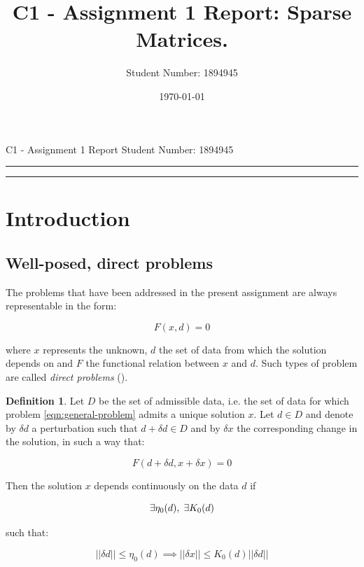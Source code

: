 \documentclass{article}
\title{C1 - Assignment 1 Report: Sparse Matrices.} %
\author{Student Number: 1894945} %
\date{\today} %
\theoremstyle{theorem}
\theoremstyle{definition}
\newtheorem{definition}{Definition}
\begin{document}
\maketitle %

\begin{center}
C1 - Assignment 1 Report \hfill
Student Number: 1894945
\vspace{3pt} \hrule \vspace{3pt} \hrule
\end{center}

\tableofcontents

\clearpage



\section{Introduction}

\subsection{Well-posed, direct problems}
The problems that have been addressed in the present assignment are always representable in the form: 

\begin{equation}
	\label{eqn:general-problem}
	F(x, d) = 0
\end{equation}

where $x$ represents the unknown, $d$ the set of data from which the solution depends on and $F$ the functional relation between $x$ and $d$. Such types of problem are called \emph{direct problems} (\cite{numerical-math}).\\

\begin{definition}
	\label{defn:cont-dep}
	Let $D$ be the set of admissible data, i.e. the set of data for which problem \eqref{eqn:general-problem} admits a unique solution $x$. Let $d\in D$ and denote by $\delta d$ a perturbation such that $d + \delta d\in D$ and by $\delta x$ the corresponding change in the solution, in such a way that:
	
	$$F(d+\delta d, x+\delta x) = 0$$
	
	Then the solution $x$ depends continuously on the data $d$ if
	
	$$\exists\eta_0(d),\hspace{1mm}\exists K_0(d)$$ 
	
	such that:
	
	$$||\delta d||\le\eta_0(d)\implies ||\delta x||\le K_0(d)||\delta d||$$
	 
\end{definition}
\end{document}
